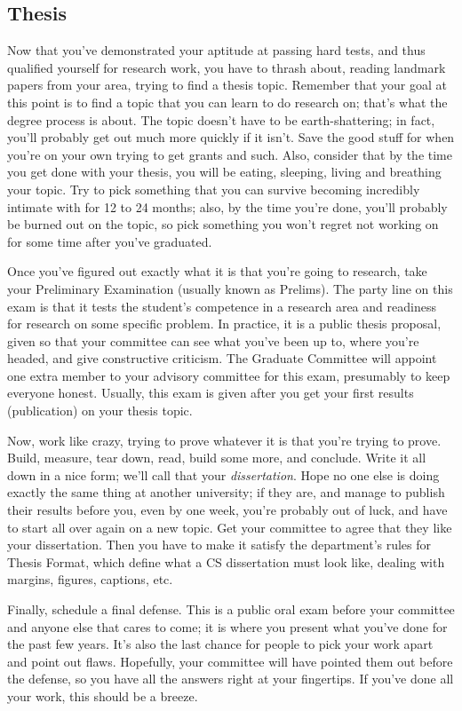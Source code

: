 \subsection{Thesis}
Now that you've demonstrated your aptitude at passing hard tests, and thus qualified yourself for research work, you have to thrash about, reading landmark papers from your area, trying to find a thesis topic. Remember that your goal at this point is to find a topic that you can learn to do research on; that's what the degree process is about. The topic doesn't have to be earth-shattering; in fact, you'll probably get out much more quickly if it isn't. Save the good stuff for when you're on your own trying to get grants and such. Also, consider that by the time you get done with your thesis, you will be eating, sleeping, living and breathing your topic. Try to pick something that you can survive becoming incredibly intimate with for 12 to 24 months; also, by the time you're done, you'll probably be burned out on the topic, so pick something you won't regret not working on for some time after you've graduated.

Once you've figured out exactly what it is that you're going to research, take your Preliminary Examination (usually known as Prelims). The party line on this exam is that it tests the student's competence in a research area and readiness for research on some specific problem. In practice, it is a public thesis proposal, given so that your committee can see what you've been up to, where you're headed, and give constructive criticism. The Graduate Committee will appoint one extra member to your advisory committee for this exam, presumably to keep everyone honest. Usually, this exam is given after you get your first results (publication) on your thesis topic.

Now, work like crazy, trying to prove whatever it is that you're trying to prove. Build, measure, tear down, read, build some more, and conclude. Write it all down in a nice form; we'll call that your \emph{dissertation}. Hope no one else is doing exactly the same thing at another university; if they are, and manage to publish their results before you, even by one week, you're probably out of luck, and have to start all over again on a new topic. Get your committee to agree that they like your dissertation. Then you have to make it satisfy the department's rules for Thesis Format, which define what a CS dissertation must look like, dealing with margins, figures, captions, etc.

Finally, schedule a final defense. This is a public oral exam before your committee and anyone else that cares to come; it is where you present what you've done for the past few years. It's also the last chance for people to pick your work apart and point out flaws. Hopefully, your committee will have pointed them out before the defense, so you have all the answers right at your fingertips. If you've done all your work, this should be a breeze.

